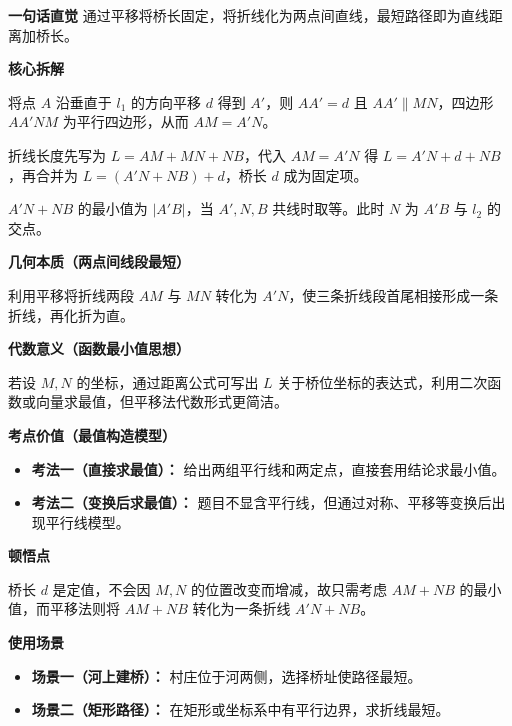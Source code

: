 \begin{explanationbox}
	\textbf{\textcolor{CExplanation}{一句话直觉}}
	通过平移将桥长固定，将折线化为两点间直线，最短路径即为直线距离加桥长。

	\medskip
	\textbf{\textcolor{CExplanation}{核心拆解}}
	\begin{description}[style=nextline, leftmargin=2.8em, labelsep=0.5em, itemsep=0.45em]
		\item[\textbf{要点一（平移转化）：}]
			将点 $A$ 沿垂直于 $l_1$ 的方向平移 $d$ 得到 $A'$，则 $AA'=d$ 且 $AA'\parallel MN$，四边形 $AA'NM$ 为平行四边形，从而 $AM = A'N$。
		\item[\textbf{要点二（折线重组）：}]
			折线长度先写为 $L = AM + MN + NB$，代入 $AM=A'N$ 得 $L = A'N + d + NB$，再合并为 $L = (A'N+NB)+d$，桥长 $d$ 成为固定项。
		\item[\textbf{要点三（两点最短）：}]
			$A'N+NB$ 的最小值为 $|A'B|$，当 $A',N,B$ 共线时取等。此时 $N$ 为 $A'B$ 与 $l_2$ 的交点。
	\end{description}

	\medskip
	\textbf{\textcolor{CExplanation}{几何本质（两点间线段最短）}}
	\par 利用平移将折线两段 $AM$ 与 $MN$ 转化为 $A'N$，使三条折线段首尾相接形成一条折线，再化折为直。

	\medskip
	\textbf{\textcolor{CExplanation}{代数意义（函数最小值思想）}}
	\par 若设 $M,N$ 的坐标，通过距离公式可写出 $L$ 关于桥位坐标的表达式，利用二次函数或向量求最值，但平移法代数形式更简洁。

	\medskip
	\textbf{\textcolor{CExplanation}{考点价值（最值构造模型）}}
	\begin{itemize}[leftmargin=*, itemsep=0.5em, topsep=0.4em]
		\item \textbf{考法一（直接求最值）：} 给出两组平行线和两定点，直接套用结论求最小值。
		\item \textbf{考法二（变换后求最值）：} 题目不显含平行线，但通过对称、平移等变换后出现平行线模型。
	\end{itemize}

	\medskip
	\textbf{\textcolor{CExplanation}{顿悟点}}
	\par 桥长 $d$ 是定值，不会因 $M,N$ 的位置改变而增减，故只需考虑 $AM+NB$ 的最小值，而平移法则将 $AM+NB$ 转化为一条折线 $A'N+NB$。

	\medskip
	\textbf{\textcolor{CExplanation}{使用场景}}
	\begin{itemize}[leftmargin=*, itemsep=0.5em, topsep=0.4em]
		\item \textbf{场景一（河上建桥）：} 村庄位于河两侧，选择桥址使路径最短。
		\item \textbf{场景二（矩形路径）：} 在矩形或坐标系中有平行边界，求折线最短。
	\end{itemize}

\end{explanationbox}
